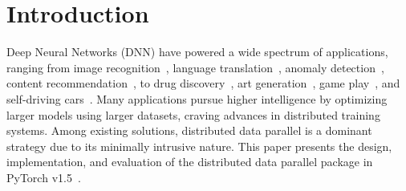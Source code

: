 \section{Introduction}

Deep Neural Networks (DNN) have powered a wide spectrum of applications, ranging from image recognition~\cite{resnet}, language translation~\cite{bert}, anomaly detection~\cite{du2017deeplog}, content recommendation~\cite{van2013deep}, to drug discovery~\cite{ramsundar2019deep}, art generation~\cite{mao2017deepart}, game play~\cite{guo2014deep}, and self-driving cars~\cite{bojarski2016end}. Many applications pursue higher intelligence by optimizing larger models using larger datasets, craving advances in distributed training systems. Among existing solutions, distributed data parallel is a dominant strategy due to its minimally intrusive nature. This paper presents the design, implementation, and evaluation of the distributed data parallel package in PyTorch v1.5~\cite{pytorch:nips:2019}.

